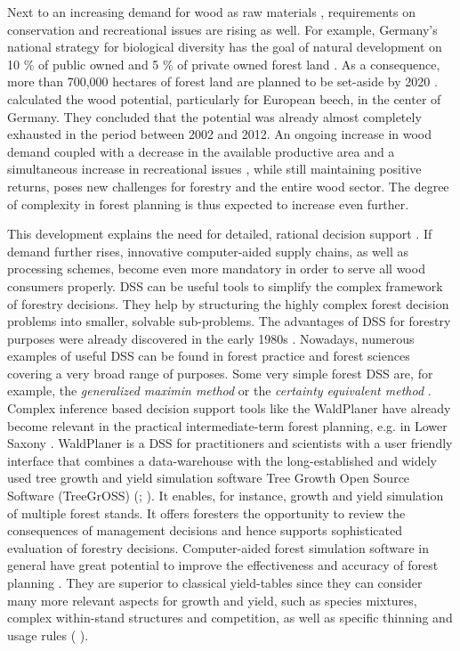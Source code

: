Next to an increasing demand for wood as raw materials \citep[p. 8]{mantau_2012}, requirements on conservation and recreational issues are rising as well. For example, Germany's national strategy for biological diversity has the goal of natural development on 10 \% of public owned and 5 \% of private owned forest land \citep[p. 45]{bmu_2007}. As a consequence, more than 700,000 hectares of forest land are planned to be set-aside by 2020 \citep{ti_2014}. \citet[p. 3]{auer_2016} calculated the wood potential, particularly for European beech, in the center of Germany. They concluded that the potential was already almost completely exhausted in the period between 2002 and 2012. An ongoing increase in wood demand coupled with a decrease in the available productive area and a simultaneous increase in recreational issues \citep[p. 1]{hansen_2012}, while still maintaining positive returns, poses new challenges for forestry and the entire wood sector. The degree of complexity in forest planning is thus expected to increase even further.

This development explains the need for detailed, rational decision support \citep[p. 2]{hansen_2014}. If demand further rises, innovative computer-aided supply chains, as well as processing schemes, become even more mandatory in order to serve all wood consumers properly. DSS can be useful tools to simplify the complex framework of forestry decisions. They help by structuring the highly complex forest decision problems into smaller, solvable sub-problems. The advantages of DSS for forestry purposes were already discovered in the early 1980s \citep[p. 499]{reynolds_2008}. Nowadays, numerous examples of useful DSS can be found in forest practice and forest sciences covering a very broad range of purposes. Some very simple forest DSS are, for example, the \textit{generalized maximin method} or the \textit{certainty equivalent method} \citep[p. 25, 28]{kangas_2015}. Complex inference based decision support tools like the WaldPlaner \citep{hansen_2014} have already become relevant in the practical intermediate-term forest planning, e.g. in Lower Saxony \citep[p. 158]{bockmann_2004}. WaldPlaner is a DSS for practitioners and scientists with a user friendly interface that combines a data-warehouse with the long-established and widely used tree growth and yield simulation software Tree Growth Open Source Software (TreeGrOSS) (\citealp[p. 46]{hansen_2014}; \citealp{nagel_2009}). It enables, for instance, growth and yield simulation of multiple forest stands. It offers foresters the opportunity to review the consequences of management decisions and hence supports sophisticated evaluation of forestry decisions. Computer-aided forest simulation software in general have great potential to improve the effectiveness and accuracy of forest planning \citep[p. 210]{davis_2001}. They are superior to classical yield-tables since they can consider many more relevant aspects for growth and yield, such as species mixtures, complex within-stand structures and competition, as well as specific thinning and usage rules (\citealp[p. 3]{hansen_2012} \citealp[p. 93]{muys_2010}).

